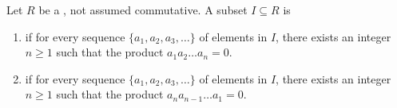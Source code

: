 \begin{definition} \label{definition:left_right_T_nilpotent_subset_of_a_ring}
    Let $R$ be a , not assumed commutative.  
    A subset $I \subseteq R$ is 
    \begin{enumerate}
        \item {} if for every sequence $\{a_1, a_2, a_3, \dots\}$ of elements in $I$, there exists an integer $n \geq 1$ such that the product $a_1 a_2 \dots a_n = 0$.
        \item {} if for every sequence $\{a_1, a_2, a_3, \dots\}$ of elements in $I$, there exists an integer $n \geq 1$ such that the product $a_n a_{n-1} \dots a_1 = 0$.
    \end{enumerate}
\end{definition}